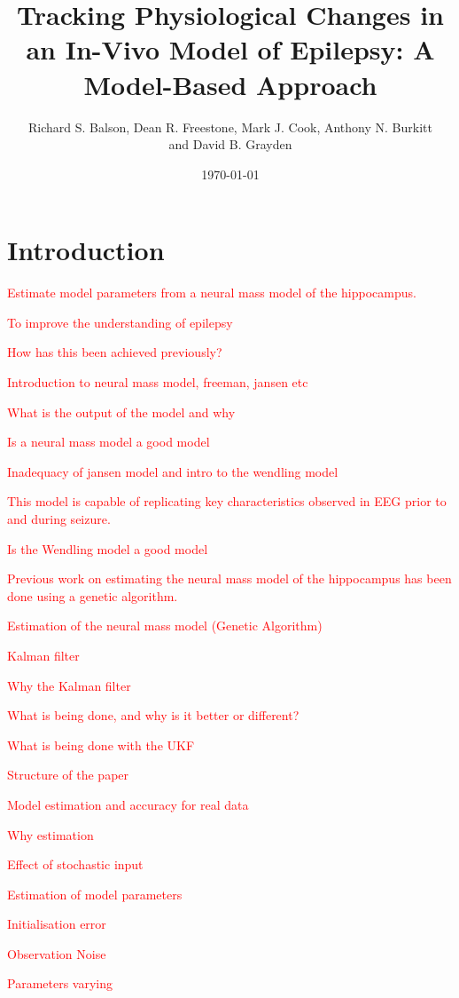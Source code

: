 \documentclass[10pt]{article}%
\title{Tracking Physiological Changes in an In-Vivo Model of Epilepsy: A Model-Based Approach}
\date{\today}
\author{Richard S. Balson, Dean R. Freestone, Mark J. Cook, Anthony N. Burkitt \\ and David B. Grayden}
\newcommand\red{\textcolor{red}}
\begin{document}
\maketitle

\section{Introduction}

\red{Estimate model parameters from a neural mass model of the hippocampus.}

\red{To improve the understanding of epilepsy} 

\red{How has this been achieved previously?}

\red{Introduction to neural mass model, freeman, jansen etc}

\red{What is the output of the model and why}

\red{Is a neural mass model a good model}

\red{Inadequacy of jansen model and intro to the wendling model}

\red{This model is capable of replicating key characteristics observed in EEG prior to and during seizure.}

\red{Is the Wendling model a good model}

\red{Previous work on estimating the neural mass model of the hippocampus has been done using a genetic algorithm.}

\red{Estimation of the neural mass model (Genetic Algorithm)}

\red{Kalman filter}

\red{Why the Kalman filter}

\red{What is being done, and why is it better or different?}

\red{What is being done with the UKF}

\red{Structure of the paper}

\red{Model estimation and accuracy for real data}









\red{Why estimation}

\red{Effect of stochastic input}

\red{Estimation of model parameters}

\red{Initialisation error}

\red{Observation Noise}

\red{Parameters varying}

% 
% 
% 
% 
% 
% 



\end{document}
